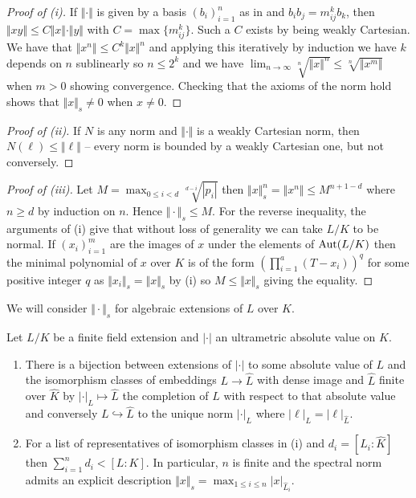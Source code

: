 \begin{proof}[Proof of (i)]
    If $\Vert\cdot\Vert$ is given by a basis $(b_{i})_{i=1}^{n}$ as in  and $b_{i}b_{j}=m_{ij}^{k}b_{k}$, then $\Vert xy\Vert\leq C\Vert x\Vert\cdot\Vert y\Vert$ with $C=\max\{m_{ij}^{k}\}$. Such a $C$ exists by being weakly Cartesian. We have that $\Vert x^{n}\Vert\leq C^{k}\Vert x\Vert^{n}$ and applying this iteratively by induction we have $k$ depends on $n$ sublinearly so $n\leq 2^{k}$ and we have $\lim_{n\to\infty}\sqrt[n]{\Vert x\Vert^{n}}\leq\sqrt[n]{\Vert x^{m}\Vert}$ when $m>0$ showing convergence. Checking that the axioms of the norm hold shows that $\Vert x\Vert_{s}\neq0$ when $x\neq0$. 
\end{proof}
\begin{proof}[Proof of (ii)]
    If $N$ is any norm and $\Vert\cdot\Vert$ is a weakly Cartesian norm, then $N(\ell)\leq\Vert \ell\Vert$ -- every norm is bounded by a weakly Cartesian one, but not conversely. 
\end{proof}
\begin{proof}[Proof of (iii)]
    Let $M=\max_{0\leq i<d}\sqrt[d-i]{|p_{i}|}$ then $\Vert x\Vert_{s}^{n}=\Vert x^{n}\Vert\leq M^{n+1-d}$ where $n\geq d$ by induction on $n$. Hence $\Vert\cdot\Vert_{s}\leq M$. For the reverse inequality, the arguments of (i) give that without loss of generality we can take $L/K$ to be normal. If $(x_{i})_{i=1}^{m}$ are the images of $x$ under the elements of $\mathrm{Aut}(L/K)$ then the minimal polynomial of $x$ over $K$ is of the form $\left(\prod_{i=1}^{a}(T-x_{i})\right)^{q}$ for some positive integer $q$ as $\Vert x_{i}\Vert_{s}=\Vert x\Vert_{s}$ by (i) so $M\leq\Vert x\Vert_{s}$ giving the equality. 
\end{proof}
We will consider $\Vert\cdot\Vert_{s}$ for algebraic extensions of $L$ over $K$. 
\begin{proposition}\label{prop: spectral norm for field extensions}
    Let $L/K$ be a finite field extension and $|\cdot|$ an ultrametric absolute value on $K$. 
    \begin{enumerate}[label=(\roman*)]
        \item There is a bijection between extensions of $|\cdot|$ to some absolute value of $L$ and the isomorphism classes of embeddings $L\to\widehat{L}$ with dense image and $\widehat{L}$ finite over $\widehat{K}$ by $|\cdot|_{L}\mapsto\widehat{L}$ the completion of $L$ with respect to that absolute value and conversely $L\hookrightarrow\widehat{L}$ to the unique norm $|\cdot|_{L}$ where $|\ell|_{L}=|\ell|_{\widehat{L}}$. 
        \item For a list of representatives of isomorphism classes in (i) and $d_{i}=[\widehat{L}_{i}:\widehat{K}]$ then $\sum_{i=1}^{n}d_{i}<[L:K]$. In particular, $n$ is finite and the spectral norm admits an explicit description $\Vert x\Vert_{s}=\max_{1\leq i\leq n}|x|_{\widehat{L}_{i}}$. 
    \end{enumerate}
\end{proposition}
